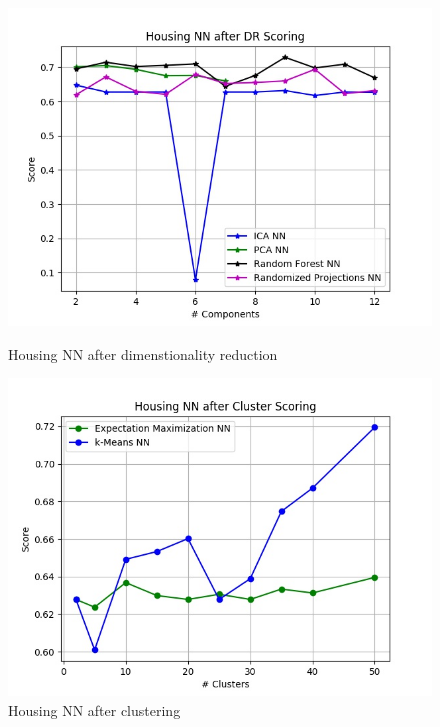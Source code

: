 \documentclass[h]{article}
\begin{document}
 \begin{figure}[H]
   \endminipage\hfill 
      \includegraphics[width=1\textwidth,keepaspectratio]{housing_nn_after_dr_scoring.jpg} 
      \caption*{Housing NN after dimenstionality reduction } 
   \endminipage\hfill
      \includegraphics[width=1\textwidth,keepaspectratio]{housing_nn_after_cluster_scoring.jpg} 
      \caption*{Housing NN after clustering} 
   \endminipage\hfill
   \endminipage\hfill
\end{figure}
\end{document}
